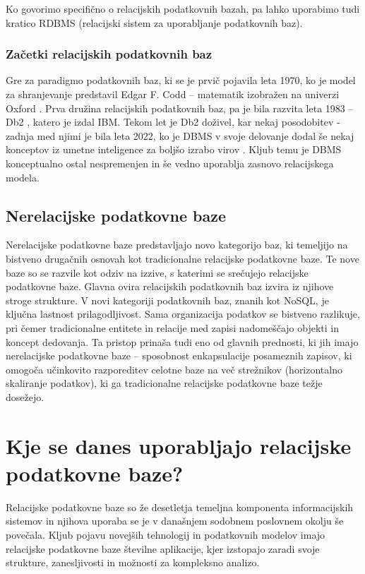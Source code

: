 \documentclass[a4paper,12pt,openright]{book}
\begin{document}
        Ko govorimo specifično o relacijskih podatkovnih bazah, pa lahko uporabimo tudi kratico RDBMS (relacijski sistem za uporabljanje podatkovnih baz). 

        \subsubsection{Začetki relacijskih podatkovnih baz}
        Gre za paradigmo podatkovnih baz, ki se je prvič pojavila leta 1970, ko je model za shranjevanje predstavil Edgar F. Codd – matematik izobražen na univerzi Oxford \cite{IBM_DBMS_1970}. Prva družina relacijskih podatkovnih baz, pa je bila razvita leta 1983 – Db2 \cite{DB2}, katero je izdal IBM. Tekom let je Db2 doživel, kar nekaj posodobitev - zadnja med njimi je bila leta 2022, ko je DBMS v svoje delovanje dodal še nekaj konceptov iz umetne inteligence za boljšo izrabo virov \cite{DB213}. Kljub temu je DBMS konceptualno ostal nespremenjen in še vedno uporablja zasnovo relacijskega modela.
        
        \subsection{Nerelacijske podatkovne baze}
        Nerelacijske podatkovne baze predstavljajo novo kategorijo baz, ki temeljijo na bistveno drugačnih osnovah kot tradicionalne relacijske podatkovne baze. Te nove baze so se razvile kot odziv na izzive, s katerimi se srečujejo relacijske podatkovne baze. Glavna ovira relacijskih podatkovnih baz izvira iz njihove stroge strukture. V novi kategoriji podatkovnih baz, znanih kot NoSQL, je ključna lastnost prilagodljivost. Sama organizacija podatkov se bistveno razlikuje, pri čemer tradicionalne entitete in relacije med zapisi nadomeščajo objekti in koncept dedovanja. Ta pristop prinaša tudi eno od glavnih prednosti, ki jih imajo nerelacijske podatkovne baze – sposobnost enkapsulacije posameznih zapisov, ki omogoča učinkovito razporeditev celotne baze na več strežnikov (horizontalno skaliranje podatkov), ki ga tradicionalne relacijske podatkovne baze težje dosežejo.
    
    \section{Kje se danes uporabljajo relacijske podatkovne baze?}

    Relacijske podatkovne baze so že desetletja temeljna komponenta informacijskih sistemov in njihova uporaba se je v današnjem sodobnem poslovnem okolju še povečala. Kljub pojavu novejših tehnologij in podatkovnih modelov imajo relacijske podatkovne baze številne aplikacije, kjer izstopajo zaradi svoje strukture, zanesljivosti in možnosti za kompleksno analizo.
\end{document}
